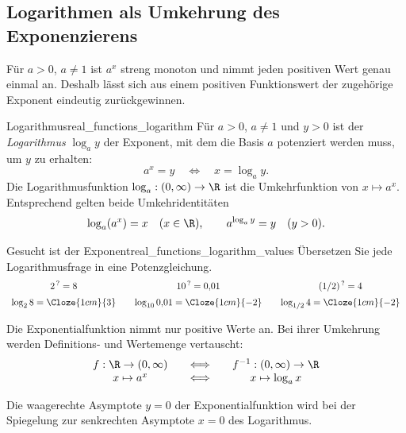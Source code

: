 \clearpage
\subsection{Logarithmen als Umkehrung des Exponenzierens}
\label{subsec:real_functions_logarithms}
Für $a>0$, $a\ne1$ ist $a^x$ streng monoton und nimmt jeden positiven
Wert genau einmal an. Deshalb lässt sich aus einem positiven
Funktionswert der zugehörige Exponent eindeutig zurückgewinnen.
\par\noindent\begin{minipage}{\linewidth}
\begin{DefinitionBox}{Logarithmus}{real_functions_logarithm}
  Für $a>0$, $a\ne1$ und $y>0$ ist der \emph{Logarithmus}
   $\log_a y$ der Exponent, mit dem die Basis $a$
  potenziert werden muss, um $y$ zu erhalten:
  \[
    a^x=y\quad\Longleftrightarrow\quad x=\log_a y.
  \]
  Die Logarithmusfunktion $\log_a:(0,\infty)\to\R$ ist die
  Umkehrfunktion von $x\mapsto a^x$.
  Entsprechend gelten beide Umkehridentitäten
  \[
    \log_a(a^x)=x\quad(x\in\R),\qquad
    a^{\log_a y}=y\quad(y>0).
  \]
\end{DefinitionBox}
\begin{ExampleBox}[before skip=0.3\baselineskip]{Gesucht ist der Exponent}{real_functions_logarithm_values}
  Übersetzen Sie jede Logarithmusfrage in eine Potenzgleichung.
  \[
    \begin{array}{c@{\qquad}c@{\qquad}c}
      2^{\,?}=8&10^{\,?}=0{,}01&(1/2)^{\,?}=4\\[0.5em]
      \log_2 8=\Cloze{1cm}{3}&
      \log_{10}0{,}01=\Cloze{1cm}{-2}&
      \log_{1/2}4=\Cloze{1cm}{-2}
    \end{array}
  \]
\end{ExampleBox}
\end{minipage}

\begin{center}
\end{center}

Die Exponentialfunktion nimmt nur positive Werte an. Bei ihrer
Umkehrung werden Definitions- und Wertemenge vertauscht:
\[
  \begin{array}{c@{\qquad\Longleftrightarrow\qquad}c}
    f:\R\to(0,\infty)&f^{-1}:(0,\infty)\to\R\\
    x\mapsto a^x&x\mapsto\log_a x
  \end{array}
\]
\begin{center}
\end{center}
Die waagerechte Asymptote $y=0$ der Exponentialfunktion wird bei der
Spiegelung zur senkrechten Asymptote $x=0$ des Logarithmus.

